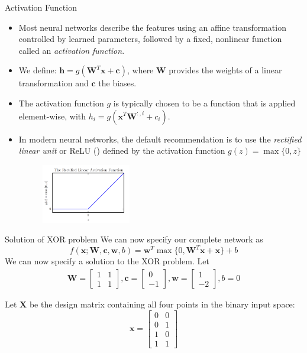 \documentclass[10pt]{beamer}
\begin{document}
	\begin{frame}{Activation Function}
		\begin{itemize}
			\item Most neural networks describe the features using an affine transformation controlled by learned parameters, followed by a fixed, nonlinear function called an \emph{activation function}.
			\item We define: $\bm{h}=g(\bm{W}^T\bm{x}+\bm{c})$, where $\bm{W}$ provides the weights of a linear transformation and $\bm{c}$ the biases.
			\item The activation function $g$ is typically chosen to be a function that is applied element-wise, with $h_i=g(\bm{x}^T\bm{W}^{:,i}+c_i)$.
			\item In modern neural networks, the default recommendation is to use the \emph{rectified linear unit} or ReLU (\citet{jarrett2009best,nair2010rectified,glorot2011deep}) defined by the activation function $g(z)=\max\{0,z\}$
			\begin{figure}
				\includegraphics[height=7em]{figures/ReLU.png}
			\end{figure}
		\end{itemize}
	\end{frame}

	\begin{frame}{Solution of XOR problem}
		We can now specify our complete network as
		\begin{equation*}
			f(\bm{x};\bm{W},\bm{c},\bm{w},b)=\bm{w}^T\max\{0,\bm{W}^T\bm{x}+\bm{x}\}+b
		\end{equation*}
		We can now specify a solution to the XOR problem. Let
		\begin{eqnarray*}
			\bm{W}=\begin{bmatrix}
			1&1\\
			1&1
			\end{bmatrix}, 
			\bm{c}=\begin{bmatrix}
				0\\
				-1
			\end{bmatrix},
			\bm{w}=\begin{bmatrix}
				1\\
				-2
			\end{bmatrix}, b=0
		\end{eqnarray*}
		
		Let $\bm{X}$ be the design matrix containing all four points in the binary input space:
		$$\bm{x}=\begin{bmatrix}
		0&0\\
		0&1\\
		1&0\\
		1&1
		\end{bmatrix}$$
	\end{frame}
\end{document}
